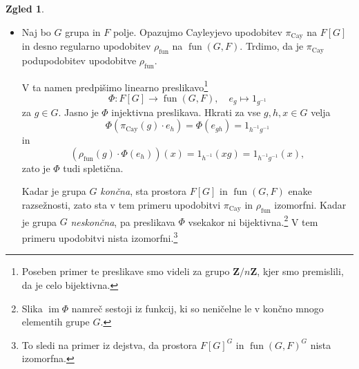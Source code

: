 \documentclass[11pt]{book}
\def\ZZ{\mathbf{Z}}
\def\oneone{\mathbf{1}}
\DeclareMathOperator\image{im}
\DeclareMathOperator\fun{fun}
\DeclareMathOperator\Cay{Cay}
\theoremstyle{definition}
\theoremstyle{zgled}
\newtheorem{zgled}[theorem]{Zgled}
\theoremstyle{zgledbrezstevilke}
\theoremstyle{odprtproblem}
\theoremstyle{domacanaloga}
\theoremstyle{izrek}
\begin{document}
\begin{zgled}
\begin{itemize}
    Torej za vsak $g \in G$ obstaja $\chi(g) \in F$, da je $\rho(g) \cdot v = \chi(g) v$. Na ta način dobimo funkcijo $\chi \colon G \to F$, se pravi element prostora $\fun(G,F)$. Ta funkcija ni čisto poljubna; ker je $\rho$ upodobitev, je $\chi$ nujno {\em homomorfizem} iz grupe $G$ v grupo $F^*$. Torej je $\chi$ pravzaprav upodobitev grupe $G$ na prostoru $F$ razsežnosti $1$.\footnote{Kadar je $\chi(g) = 1$ za vsak $g \in G$, je ta upodobitev izomorfna $\oneone$. Kadar je $\chi(g) \neq 1$ za vsaj kak $g \in G$, pa ta upodobitev \emph{ni} trivialna.} 
    
    Zdaj kot v zadnjem zgledu s predpisom
    \[
        \Phi \colon F \to V, \quad
        x \mapsto xv
    \]
    dobimo injektivno spletično med $\chi$ in $\rho$, torej lahko vidimo $\chi$ kot enorazsežno podupodobitev upodobitve $\rho$. Hkrati lahko iz te spletične obnovimo podatek o skupnem lastnem vektorju $v$ in upodobitvi $\chi$.\footnote{Namreč, $v = \Phi(1)$ in $\chi(g) v = \Phi(\chi(g) \cdot 1) = \rho(g) \cdot \Phi(1)$.} 
    
    Vzpostavili smo torej bijektivno korespondenco med množico enorazsežnih podupodobitev upodobitve $\rho$ in skupnimi lastnimi vektorji vseh preslikav $\rho(g)$ za $g \in G$.

    Poseben primer te korespondence je zadnji zgled. Množico enorazsežnih trivialnih podupodobitev upodobitve $\rho$ lahko identificiramo z množico neničelnih spletičen $\hom_G(\oneone, V) \backslash \{ x \mapsto 0 \}$, ta pa ustreza skupnim lastnim vektorjem $\rho(g)$ za $g \in G$ z lastno vrednostjo $1$, kar je ravno množica $V^G \backslash \{ 0 \}$.

    \item Naj bo $G$ grupa in $F$ polje. Opazujmo Cayleyjevo upodobitev $\pi_{\Cay}$ na $F[G]$ in desno regularno upodobitev $\rho_{\fun}$ na $\fun(G,F)$. Trdimo, da je $\pi_{\Cay}$ podupodobitev upodobitve $\rho_{\fun}$.
    
    V ta namen predpišimo linearno preslikavo\footnote{Poseben primer te preslikave smo videli za grupo $\ZZ/n\ZZ$, kjer smo premislili, da je celo bijektivna.}
    \[
        \Phi \colon F[G] \to \fun(G,F), \quad
        e_g \mapsto 1_{g^{-1}}
    \]
    za $g \in G$. Jasno je $\Phi$ injektivna preslikava. Hkrati za vse $g,h,x \in G$ velja
    \[
        \Phi(\pi_{\Cay}(g) \cdot e_h) 
        = \Phi(e_{gh})
        = 1_{h^{-1} g^{-1}}
    \]
    in
    \[
        \left( \rho_{\fun}(g) \cdot \Phi(e_h) \right)(x)
        = 1_{h^{-1}}(xg)
        = 1_{h^{-1} g^{-1}}(x),
    \]
    zato je $\Phi$ tudi spletična.

    Kadar je grupa $G$ \emph{končna}, sta prostora $F[G]$ in $\fun(G,F)$ enake razsežnosti, zato sta v tem primeru upodobitvi $\pi_{\Cay}$ in $\rho_{\fun}$ izomorfni. Kadar je grupa $G$ \emph{neskončna}, pa preslikava $\Phi$ vsekakor ni bijektivna.\footnote{Slika $\image \Phi$ namreč sestoji iz funkcij, ki so neničelne le v končno mnogo elementih grupe $G$.} V tem primeru upodobitvi nista izomorfni.\footnote{To sledi na primer iz dejstva, da prostora $F[G]^G$ in $\fun(G,F)^G$ nista izomorfna.}
\end{itemize}
\end{zgled}
\end{document}
